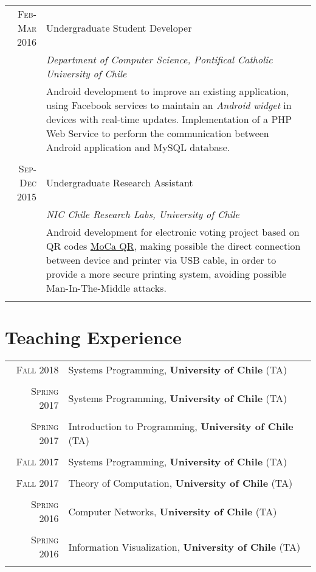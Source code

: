 \documentclass[a4paper,10pt]{article}
\begin{document}
\begin{tabular}{r|p{13cm}}
\textsc{Feb-Mar 2016} & Undergraduate Student Developer\\&\emph{Department of Computer Science, Pontifical Catholic University of Chile}\\&\footnotesize{Android development to improve an existing application, using Facebook services to maintain an \textit{Android widget} in devices with real-time updates. Implementation of a PHP Web Service to perform the communication between Android application and MySQL database.}\\\multicolumn{2}{c}{} \\

\textsc{Sep-Dec 2015} & Undergraduate Research Assistant \\&\emph{NIC Chile Research Labs, University of Chile}\\&\footnotesize{Android development for electronic voting project based on QR codes \href{http://cjgomez.cl/moca/}{MoCa QR}, making possible the direct connection between device and printer via USB cable, in order to provide a more secure printing system, avoiding possible Man-In-The-Middle attacks.}\\\multicolumn{2}{c}{} \\

\end{tabular}

\section{Teaching Experience}
\begin{tabular}{rl}	
\textsc{Fall} 2018& Systems Programming, \textbf{University of Chile} (TA)\\&\\
\textsc{Spring} 2017& Systems Programming, \textbf{University of Chile} (TA)\\&\\
\textsc{Spring} 2017& Introduction to Programming, \textbf{University of Chile} (TA)\\&\\
\textsc{Fall} 2017& Systems Programming, \textbf{University of Chile} (TA)\\&\\
\textsc{Fall} 2017& Theory of Computation, \textbf{University of Chile} (TA)\\&\\
\textsc{Spring} 2016& Computer Networks, \textbf{University of Chile} (TA)\\&\\
\textsc{Spring} 2016& Information Visualization, \textbf{University of Chile} (TA)\\&\\
\end{tabular}
\end{document}
